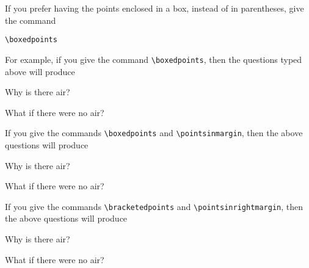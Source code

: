 \documentclass[12pt]{exam}
\begin{document}
If you prefer having the points enclosed in a box, instead of in
parentheses, give the command
\begin{center}
  \verb"\boxedpoints"
\end{center}
For example, if you give the command \verb"\boxedpoints", then the
questions typed above will produce
%
\nopointsinmargin
\boxedpoints
\begin{questions}
\question[20]
Why is there air?


\question
What if there were no air?


\end{questions}
%
If you give the commands \verb"\boxedpoints" and
\verb"\pointsinmargin", then the above questions will produce
\boxedpoints
\pointsinmargin
\begin{questions}
\question[20]
Why is there air?


\question
What if there were no air?


\end{questions}
%
If you give the commands \verb"\bracketedpoints" and
\verb"\pointsinrightmargin", then the above questions will produce
%
\bracketedpoints
\pointsinrightmargin
\begin{questions}
\question[20]
Why is there air?


\question
What if there were no air?


\end{questions}
\end{document}
